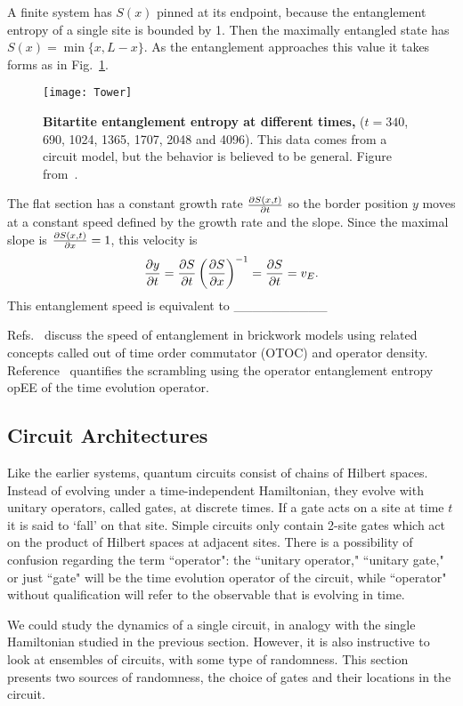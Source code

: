 A finite system has $S(x)$ pinned at its endpoint, because the entanglement entropy of a single site is bounded by 1. Then the maximally entangled state has $S(x) = \min\{x,L-x\}$. As the entanglement approaches this value it takes forms as in Fig.~\ref{fig:Tower}.
\begin{figure}
	\centering
	\texttt{[image: Tower]}
	\caption{\textbf{Bitartite entanglement entropy at different times,} ($t = 340$, 690, 1024, 1365, 1707, 2048 and 4096). This data comes from a circuit model, but the behavior is believed to be general. Figure from~\cite{Nahum2017}.}
	\label{fig:Tower}
\end{figure}
The flat section has a constant growth rate $\frac{\partial S(x,t)}{\partial t}$ so the border position $y$ moves at a constant speed defined by the growth rate and the slope. Since the maximal slope is $\frac{\partial S(x,t)}{\partial x}=1$, this velocity is
\begin{align}
\frac{\partial y}{\partial t} = \frac{\partial S}{\partial t}\left(\frac{\partial S}{\partial x}\right)^{-1} = \frac{\partial S}{\partial t} = v_E. 
\label{eqn:vE}
\end{align}
This entanglement speed is equivalent to \_\_\_\_\_\_\_\_\_\_

Refs.~\cite{Keyserlingk, Jonay17, Jonay18, Nahum2017} discuss the speed of entanglement in brickwork models using related concepts called out of time order commutator (OTOC) and operator density. Reference~\cite{Zhou2017} quantifies the scrambling using the operator entanglement entropy opEE of the time evolution operator.

\subsection{Circuit Architectures} \label{sub:arch}

Like the earlier systems, quantum circuits consist of chains of Hilbert spaces. Instead of evolving under a time-independent Hamiltonian, they evolve with unitary operators, called gates, at discrete times. If a gate acts on a site at time $t$ it is said to `fall' on that site. Simple circuits only contain 2-site gates which act on the product of Hilbert spaces at adjacent sites. There is a possibility of confusion regarding the term ``operator": the ``unitary operator," ``unitary gate," or just ``gate" will be the time evolution operator of the circuit, while ``operator" without qualification will refer to the observable that is evolving in time.

We could study the dynamics of a single circuit, in analogy with the single Hamiltonian studied in the previous section. However, it is also instructive to look at ensembles of circuits, with some type of randomness. This section presents two sources of randomness, the choice of gates and their locations in the circuit.

